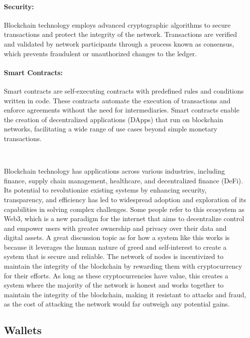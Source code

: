 \paragraph{Security:}
Blockchain technology employs advanced cryptographic algorithms to secure transactions and protect the integrity of the network. Transactions are verified and validated by network participants through a process known as consensus, which prevents fraudulent or unauthorized changes to the ledger.

\paragraph{Smart Contracts:}
Smart contracts are self-executing contracts with predefined rules and conditions written in code. These contracts automate the execution of transactions and enforce agreements without the need for intermediaries. Smart contracts enable the creation of decentralized applications (DApps) that run on blockchain networks, facilitating a wide range of use cases beyond simple monetary transactions.

~

Blockchain technology has applications across various industries, including finance, supply chain management, healthcare, and decentralized finance (DeFi). Its potential to revolutionize existing systems by enhancing security, transparency, and efficiency has led to widespread adoption and exploration of its capabilities in solving complex challenges. Some people refer to this ecosystem as Web3, which is a new paradigm for the internet that aims to decentralize control and empower users with greater ownership and privacy over their data and digital assets.
A great discussion topic as for how a system like this works is because it leverages the human nature of greed and self-interest to create a system that is secure and reliable. The network of nodes is incentivized to maintain the integrity of the blockchain by rewarding them with cryptocurrency for their efforts. As long as these cryptocurrencies have value, this creates a system where the majority of the network is honest and works together to maintain the integrity of the blockchain, making it resistant to attacks and fraud, as the cost of attacking the network would far outweigh any potential gains.

\subsection{Wallets}
\label{subsec:wallets}

